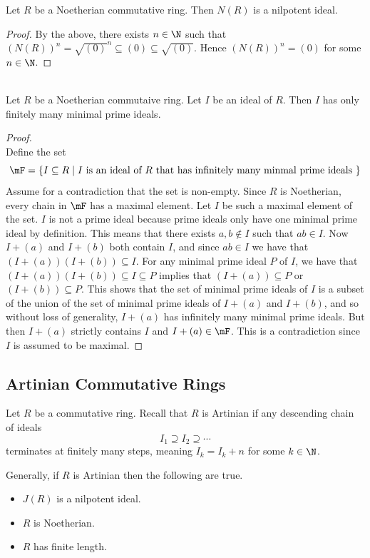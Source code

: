 \documentclass[a4paper]{article}
\begin{document}
\begin{prp}{}{} Let $R$ be a Noetherian commutative ring. Then $N(R)$ is a nilpotent ideal. 
\begin{proof}
By the above, there exists $n\in\N$ such that $(N(R))^n=\sqrt{(0)}^n\subseteq (0)\subseteq\sqrt{(0)}$. Hence $(N(R))^n=(0)$ for some $n\in\N$. 
\end{proof}
\end{prp}

\begin{prp}{}{}\\
Let $R$ be a Noetherian commutaive ring. Let $I$ be an ideal of $R$. Then $I$ has only finitely many minimal prime ideals. 
\begin{proof}\\
Define the set $$\mF=\{I\subseteq R\;|\;I\text{ is an ideal of }R\text{ that has infinitely many minmal prime ideals }\}$$ Assume for a contradiction that the set is non-empty. Since $R$ is Noetherian, every chain in $\mF$ has a maximal element. Let $I$ be such a maximal element of the set. $I$ is not a prime ideal because prime ideals only have one minimal prime ideal by definition. This means that there exists $a,b\notin I$ such that $ab\in I$. Now $I+(a)$ and $I+(b)$ both contain $I$, and since $ab\in I$ we have that $(I+(a))(I+(b))\subseteq I$. For any minimal prime ideal $P$ of $I$, we have that $(I+(a))(I+(b))\subseteq I\subseteq P$ implies that $(I+(a))\subseteq P$ or $(I+(b))\subseteq P$. This shows that the set of minimal prime ideals of $I$ is a subset of the union of the set of minimal prime ideals of $I+(a)$ and $I+(b)$, and so without loss of generality, $I+(a)$ has infinitely many minimal prime ideals. But then $I+(a)$ strictly contains $I$ and $I+(a)\in\mF$. This is a contradiction since $I$ is assumed to be maximal. 
\end{proof}
\end{prp}

\subsection{Artinian Commutative Rings}
Let $R$ be a commutative ring. Recall that $R$ is Artinian if any descending chain of ideals $$I_1\supseteq I_2\supseteq\cdots$$ terminates at finitely many steps, meaning $I_k=I_k+n$ for some $k\in\N$. 

Generally, if $R$ is Artinian then the following are true. 
\begin{itemize}
\item $J(R)$ is a nilpotent ideal. 
\item $R$ is Noetherian. 
\item $R$ has finite length. 
\end{itemize}
\end{document}
